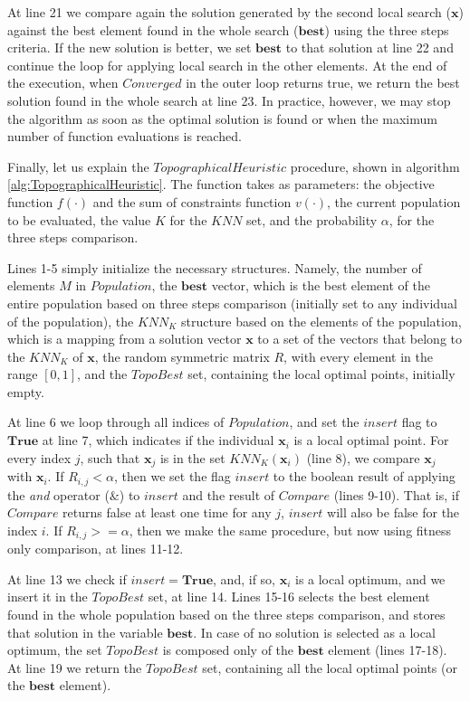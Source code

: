 At line 21 we compare again the solution generated by the second local search ($\bm{x}$) against the best element found in the whole search ($\bm{best}$) using the three steps criteria. If the new solution is better, we set $\bm{best}$ to that solution at line 22 and continue the loop for applying local search in the other elements. At the end of the execution, when $Converged$ in the outer loop returns true, we return the best solution found in the whole search at line 23. In practice, however, we may stop the algorithm as soon as the optimal solution is found or when the maximum number of function evaluations is reached.

Finally, let us explain the $TopographicalHeuristic$ procedure, shown in algorithm \ref{alg:TopographicalHeuristic}. The function takes as parameters: the objective function $f(\cdot)$ and the sum of constraints function $v(\cdot)$, the current population to be evaluated, the value $K$ for the $KNN$ set, and the probability $\alpha$, for the three steps comparison.





Lines 1-5 simply initialize the necessary structures. Namely, the number of elements $M$ in $Population$, the $\bm{best}$ vector, which is the best element of the entire population based on three steps comparison (initially set to any individual of the population), the $KNN_K$ structure based on the elements of the population, which is a mapping from a solution vector $\bm{x}$ to a set of the vectors that belong to the $KNN_K$ of $\bm{x}$, the random symmetric matrix $R$, with every element in the range $[0, 1]$, and the $TopoBest$ set, containing the local optimal points, initially empty.

At line 6 we loop through all indices of $Population$, and set the $insert$ flag to $\bm{True}$ at line 7, which indicates if the individual $\bm{x}_i$ is a local optimal point. For every index $j$, such that $\bm{x}_j$ is in the set $KNN_K(\bm{x}_i)$ (line 8), we compare $\bm{x}_j$ with $\bm{x}_i$. If $R_{i, j} < \alpha$, then we set the flag $insert$ to the boolean result of applying the \textit{and} operator ($\&$) to $insert$ and the result of $Compare$ (lines 9-10). That is, if $Compare$ returns false at least one time for any $j$, $insert$ will also be false for the index $i$. If $R_{i, j} >= \alpha$, then we make the same procedure, but now using fitness only comparison, at lines 11-12.

At line 13 we check if $insert = \bm{True}$, and, if so, $\bm{x}_i$ is a local optimum, and we insert it in the $TopoBest$ set, at line 14. Lines 15-16 selects the best element found in the whole population based on the three steps comparison, and stores that solution in the variable $\bm{best}$. In case of no solution is selected as a local optimum, the set $TopoBest$ is composed only of the $\bm{best}$ element (lines 17-18). At line 19 we return the $TopoBest$ set, containing all the local optimal points (or the $\bm{best}$ element).


